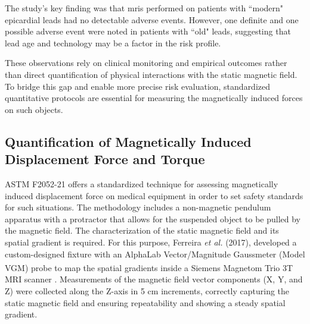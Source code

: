The study's key finding was that \gls{mri}s performed on patients with ``modern" epicardial leads had no detectable adverse events. However, one definite and one possible adverse event were noted in patients with ``old" leads, suggesting that lead age and technology may be a factor in the risk profile. 

These observations rely on clinical monitoring and empirical outcomes rather than direct quantification of physical interactions with the static magnetic field. To bridge this gap and enable more precise risk evaluation, standardized quantitative protocols are essential for measuring the magnetically induced forces on such objects.

\subsection{Quantification of Magnetically Induced Displacement Force and Torque}
\label{sec:staticfield-forces}



ASTM F2052-21 offers a standardized technique for assessing magnetically induced displacement force on medical equipment in order to set safety standards for such situations. The methodology includes a non-magnetic pendulum apparatus with a protractor that allows for the suspended object to be pulled by the magnetic field. The characterization of the static magnetic field and its spatial gradient is required. For this purpose, Ferreira \textit{et al.} (2017), developed a custom-designed fixture with an AlphaLab Vector/Magnitude Gaussmeter (Model VGM) probe to map the spatial gradients inside a Siemens Magnetom Trio \textsuperscript{\texttrademark}3T MRI scanner \cite{ferreira2017}. Measurements of the magnetic field vector components (X, Y, and Z) were collected along the Z-axis in 5 cm increments, correctly capturing the static magnetic field and ensuring repeatability and showing a steady spatial gradient. 



